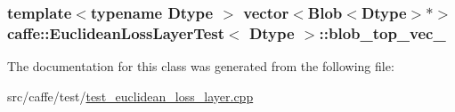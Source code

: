 \hypertarget{classcaffe_1_1_euclidean_loss_layer_test_a0613ceccb5843e4c6880d4f348d73519}{
\subsubsection[{blob\+\_\+top\+\_\+vec\+\_\+}]{\setlength{\rightskip}{0pt plus 5cm}template$<$typename Dtype $>$ vector$<${\bf Blob}$<$Dtype$>$$\ast$$>$ {\bf caffe\+::\+Euclidean\+Loss\+Layer\+Test}$<$ Dtype $>$\+::blob\+\_\+top\+\_\+vec\+\_\+\hspace{0.3cm}{\ttfamily [protected]}}}\label{classcaffe_1_1_euclidean_loss_layer_test_a0613ceccb5843e4c6880d4f348d73519}


The documentation for this class was generated from the following file\+:\begin{DoxyCompactItemize}
\item 
src/caffe/test/\hyperlink{test__euclidean__loss__layer_8cpp}{test\+\_\+euclidean\+\_\+loss\+\_\+layer.\+cpp}\end{DoxyCompactItemize}
